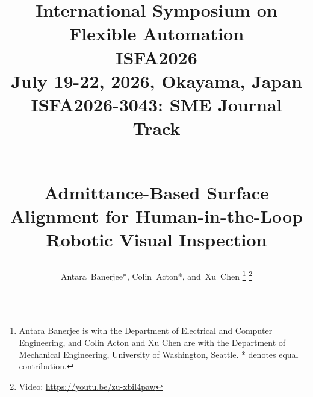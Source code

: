 \documentclass[journal]{IEEEtran}
\begin{document}
%

\title{
  \hfill\parbox{\textwidth}{\raggedleft
    \normalsize %
    International Symposium on Flexible Automation \\
    ISFA2026 \\
    July 19-22, 2026, Okayama, Japan \\[10pt]
    \Large \textbf{ISFA2026-3043: SME Journal Track}
  }\\[2em] %
  Admittance-Based Surface Alignment for Human-in-the-Loop Robotic Visual Inspection
}
%
%
%

\author{Antara~Banerjee*,
        Colin~Acton*,
        and~Xu~Chen%
\thanks{Antara Banerjee is with the Department
of Electrical and Computer Engineering, and Colin Acton and Xu Chen are with the Department of Mechanical Engineering, University of Washington, Seattle. * denotes equal contribution.}
\thanks{Video: \url{https://youtu.be/zu-xbil4paw}}}

% 
%
\end{document}
